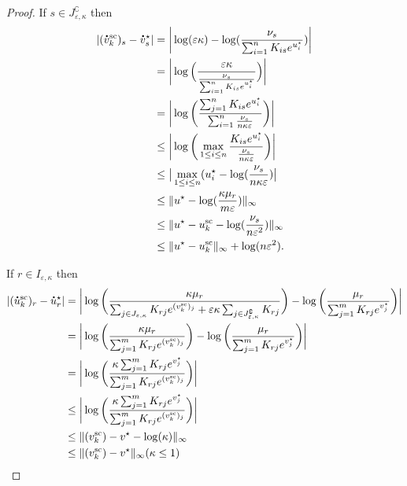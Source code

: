\begin{proof}
If $s \in J^\complement_{\varepsilon, \kappa}$ then 
\begin{align*}
|(\dt{v}^{\text{sc}}_k)_{s} - \dt{v}^\star_s| &= \bigg| \log(\varepsilon\kappa) - \log(\frac{\nu_s}{\sum_{i=1}^n K_{is}e^{u^\star_i}})\bigg|\\
&= \bigg|\log\Big(\frac{\varepsilon\kappa}{\frac{\nu_s}{\sum_{i=1}^n K_{is}e^{u^\star_i}}}\Big) \bigg|\\
&= \bigg|\log\bigg(\frac{\sum_{j=1}^n K_{is}e^{u^\star_i}}{\sum_{i=1}^n \frac{\nu_s}{n\kappa\varepsilon}}\bigg) \bigg|\\
& \leq \bigg|\log\bigg(\max_{1\leq i \leq n} \frac{K_{is}e^{u^\star_i}}{\frac{\nu_s}{n\kappa\varepsilon}}\bigg) \bigg|\\
& \leq \big|\max_{1\leq i \leq n} (u_i^\star - \log(\frac{\nu_s}{n\kappa\varepsilon})\big|\\
& \leq \norm{u^\star - \log(\frac{\kappa \mu_r}{m\varepsilon})}_\infty \\
& \leq \norm{u^\star - u^{\text{sc}}_k - \log(\frac{\nu_s}{n\varepsilon^2})}_\infty \\
& \leq \norm{u^\star - u^{\text{sc}}_k}_\infty +  \log(n\varepsilon^2).
\end{align*}

If $r \in I_{\varepsilon, \kappa}$ then 
\begin{align*}
|(\dt{u}^{\text{sc}}_k)_{r} - \dt{u}^\star_r| &= \bigg|\log\bigg(\frac{\kappa\mu_r}{\sum_{j\in J_{\varepsilon,\kappa}}K_{rj}e^{(v^{\text{sc}}_k)_j} + \varepsilon\kappa \sum_{j\in J^\complement_{\varepsilon,\kappa}}K_{rj}}\bigg) - \log\bigg(\frac{\mu_r}{\sum_{j=1}^m K_{rj}e^{v^\star_j}}\bigg)\bigg|\\
&= \bigg|\log\bigg(\frac{\kappa\mu_r}{\sum_{j=1}^m K_{rj}e^{(v^{\text{sc}}_k)_j}}\bigg) - \log\bigg(\frac{\mu_r}{\sum_{j=1}^m K_{rj}e^{v^\star_j}}\bigg)\bigg|\\
&= \bigg|\log\bigg(\frac{\kappa\sum_{j=1}^m K_{rj}e^{v^\star_j}}{\sum_{j=1}^m K_{rj}e^{(v^{\text{sc}}_k)_j}}\bigg)\bigg|\\
& \leq \bigg|\log\bigg(\frac{\kappa\sum_{j=1}^m K_{rj}e^{v^\star_j}}{\sum_{j=1}^m K_{rj}e^{(v^{\text{sc}}_k)_j}}\bigg)\bigg|\\
& \leq \norm{(v^{\text{sc}}_k) - v^\star - \log(\kappa)}_\infty\\
& \leq \norm{(v^{\text{sc}}_k) - v^\star}_\infty (\kappa \leq 1)
\end{align*}



\end{proof}
